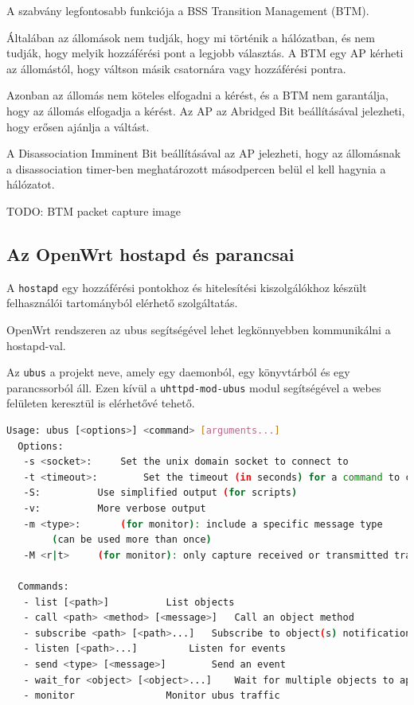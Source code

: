 \documentclass[12pt]{article}
\begin{document}
A szabvány legfontosabb funkciója a BSS Transition Management (BTM).

Általában az állomások nem tudják, hogy mi történik a hálózatban, és nem tudják, hogy melyik hozzáférési pont a legjobb választás. A BTM egy AP kérheti az állomástól, hogy váltson másik csatornára vagy hozzáférési pontra.

Azonban az állomás nem köteles elfogadni a kérést, és a BTM nem garantálja, hogy az állomás elfogadja a kérést. Az AP az Abridged Bit beállításával jelezheti, hogy erősen ajánlja a váltást.

A Disassociation Imminent Bit beállításával az AP jelezheti, hogy az állomásnak a disassociation timer-ben meghatározott másodpercen belül el kell hagynia a hálózatot.

TODO: BTM packet capture image


\subsection{Az OpenWrt hostapd és parancsai}

A \texttt{hostapd} egy hozzáférési pontokhoz és hitelesítési kiszolgálókhoz készült felhasználói tartományból elérhető szolgáltatás. \cite{hostapd}

OpenWrt rendszeren az ubus segítségével lehet legkönnyebben kommunikálni a hostapd-val.

Az \texttt{ubus} a projekt neve, amely egy daemonból, egy könyvtárból és egy parancssorból áll. Ezen kívül a \texttt{uhttpd-mod-ubus} modul segítségével a webes felületen keresztül is elérhetővé tehető. \cite{hostapd_config}

\begin{lstlisting}[language=Bash]
  Usage: ubus [<options>] <command> [arguments...]
  Options:
   -s <socket>:		Set the unix domain socket to connect to
   -t <timeout>:		Set the timeout (in seconds) for a command to complete
   -S:			Use simplified output (for scripts)
   -v:			More verbose output
   -m <type>:		(for monitor): include a specific message type
        (can be used more than once)
   -M <r|t>		(for monitor): only capture received or transmitted traffic

  Commands:
   - list [<path>]			List objects
   - call <path> <method> [<message>]	Call an object method
   - subscribe <path> [<path>...]	Subscribe to object(s) notifications
   - listen [<path>...]			Listen for events
   - send <type> [<message>]		Send an event
   - wait_for <object> [<object>...]	Wait for multiple objects to appear on ubus
   - monitor				Monitor ubus traffic
\end{lstlisting}
\end{document}
